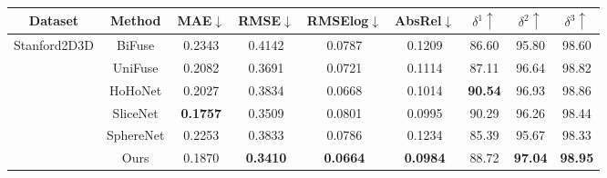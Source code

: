 \documentclass[letterpaper]{article} \usepackage{aaai21}  \usepackage{times}  \usepackage{helvet} \usepackage{courier}  \usepackage[hyphens]{url}  \usepackage{graphicx} \urlstyle{rm} \def\UrlFont{\rm}  \usepackage{natbib}  \usepackage{caption} \frenchspacing  \setlength{\pdfpagewidth}{8.5in}  \setlength{\pdfpageheight}{11in}
\begin{document}
\begin{table*}[!htb]
\centering
    \begin{tabular}{ccccccccc} 
\toprule 
Dataset & Method & MAE$\downarrow$ & RMSE$\downarrow$ & RMSElog$\downarrow$ &  AbsRel$\downarrow$ & $\delta^1\uparrow$ & $\delta^2\uparrow$ & $\delta^3\uparrow$\\
\midrule 
\multirow{6}{*}{Stanford2D3D} & BiFuse  & 0.2343 & 0.4142 & 0.0787 & 0.1209 & 86.60 & 95.80 & 98.60 \\
                            ~ & UniFuse & 0.2082 & 0.3691 & 0.0721 & 0.1114 & 87.11 & 96.64 & 98.82\\
                            ~ & HoHoNet & 0.2027 & 0.3834 & 0.0668 & 0.1014 & \textbf{90.54} & 96.93 & 98.86\\
                            ~ & SliceNet&  \textbf{0.1757} & 0.3509 & 0.0801 & 0.0995 & 90.29 & 96.26 & 98.44\\
                            ~ & SphereNet & 0.2253 & 0.3833 & 0.0786 & 0.1234 & 85.39 & 95.67 & 98.33\\
                            ~ & Ours    & 0.1870 & \textbf{0.3410} & \textbf{0.0664} & \textbf{0.0984} & 88.72 & \textbf{97.04} & \textbf{98.95} \\


\end{tabular}
\end{table*}
\end{document}
